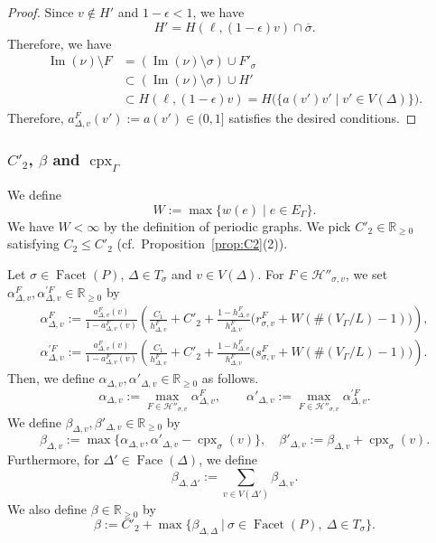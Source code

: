 \documentclass[11pt]{article}
\theoremstyle{definition}
\numberwithin{equation}{section}
\begin{document}
\begin{proof}
Since $v \not \in H'$ and $1 - \epsilon < 1$, we have 
\[
H' = H(\ell, (1 - \epsilon ) v) \cap \overline{\sigma}. 
\]
Therefore, we have 
\begin{align*}
\operatorname{Im}(\nu) \setminus F 
&= (\operatorname{Im}(\nu) \setminus \sigma) \cup F' _{\sigma} \\
&\subset (\operatorname{Im}(\nu) \setminus \sigma) \cup H' \\
&\subset H(\ell, (1- \epsilon) v) = H \bigl( \{ a(v') v' \mid v' \in V(\Delta) \} \bigr). 
\end{align*}
Therefore, $a^{F} _{\Delta, v} (v') := a(v') \in (0,1]$ satisfies the desired conditions. 
\end{proof}

\subsubsection{$C'_2$, $\beta$ and $\operatorname{cpx}_{\Gamma}$}\label{subsubsection:beta}
We define 
\[
W := \max \{ w(e) \mid e \in E_{\Gamma} \}. 
\]
We have $W  < \infty$ by the definition of periodic graphs. 
We pick $C'_2 \in \mathbb{R}_{\ge 0}$ satisfying $C_2 \le C'_2$ (cf.\ Proposition~\ref{prop:C2}(2)). 

Let $\sigma \in \operatorname{Facet}(P)$, $\Delta \in T_{\sigma}$ and $v \in V(\Delta)$. 
For $F \in \mathcal{H}'' _{\sigma, v}$, we set $\alpha ^{F} _{\Delta, v}, \alpha ^{\prime F} _{\Delta, v} \in \mathbb{R}_{\ge 0}$ by
\begin{align*}
\alpha ^{F} _{\Delta, v} 
:= \frac{a^{F} _{\Delta, v} (v)}{1-a^{F} _{\Delta, v} (v)}
\left( \frac{C_1}{h^F_{\Delta, v}} + C'_2 + \frac{1-h^F_{\Delta, v}}{h^F_{\Delta, v}} \bigl( r^{F} _{\sigma, v} + W ( \#(V_{\Gamma}/L) -1) \bigr) \right), \\
\alpha ^{\prime F} _{\Delta, v} 
:= \frac{a^{F} _{\Delta, v} (v)}{1-a^{F} _{\Delta, v} (v)}
\left( \frac{C_1}{h^F_{\Delta, v}} + C'_2 + \frac{1-h^F_{\Delta, v}}{h^F_{\Delta, v}} \bigl( s^{F} _{\sigma, v} + W(\#(V_{\Gamma}/L) -1) \bigr) \right). 
\end{align*}
Then, we define $\alpha _{\Delta, v}, \alpha ' _{\Delta, v} \in \mathbb{R}_{\ge 0}$ as follows. 
\[
\alpha _{\Delta, v} := \max _{F \in \mathcal{H}'' _{\sigma, v}} \alpha ^{F} _{\Delta, v}, \qquad
\alpha ' _{\Delta, v} := \max _{F \in \mathcal{H}'' _{\sigma, v}} \alpha ^{\prime F} _{\Delta, v}. 
\]
We define $\beta _{\Delta, v}, \beta' _{\Delta, v} \in \mathbb{R}_{\ge 0}$ by
\[
\beta_{\Delta, v} := \max \bigl\{ \alpha _{\Delta, v}, \alpha ' _{\Delta, v} - \operatorname{cpx}_{\sigma}(v) \bigr\}, \quad 
\beta' _{\Delta, v} := \beta_{\Delta, v} + \operatorname{cpx}_{\sigma}(v). 
\]
Furthermore, for $\Delta ' \in \operatorname{Face}(\Delta)$, we define
\[
\beta _{\Delta, \Delta'} := \sum_{v \in V(\Delta ')} \beta _{\Delta, v}.
\]
We also define $\beta \in \mathbb{R}_{\ge 0}$ by
\[
\beta := C' _2 + \max \bigl\{ \beta _{\Delta, \Delta} \ \big | \ \sigma \in \operatorname{Facet}(P),\ \Delta \in T_{\sigma} \bigr \}. 
\]
\end{document}
